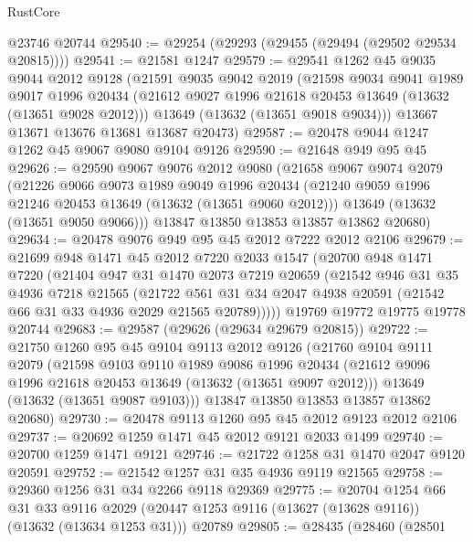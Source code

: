 \begin{lexlean}{RustCore}
\begin{coremodule}
    @23746
    @20744
@29540 := @29254 (@29293 (@29455 (@29494 (@29502 @29534 @20815))))
@29541 := @21581 @1247
@29579 := @29541
    @1262
    @45
    @9035
    @9044
    @2012
    @9128
    (@21591
      @9035
      @9042
      @2019
      (@21598
        @9034
        @9041
        @1989
        @9017
        @1996
        @20434
        (@21612 @9027 @1996 @21618 @20453 @13649 (@13632 (@13651 @9028 @2012)))
        @13649
        (@13632 (@13651 @9018 @9034)))
      @13667
      @13671
      @13676
      @13681
      @13687
      @20473)
@29587 := @20478 @9044 @1247 @1262 @45 @9067 @9080 @9104 @9126
@29590 := @21648 @949 @95 @45
@29626 := @29590
    @9067
    @9076
    @2012
    @9080
    (@21658
      @9067
      @9074
      @2079
      (@21226
        @9066
        @9073
        @1989
        @9049
        @1996
        @20434
        (@21240 @9059 @1996 @21246 @20453 @13649 (@13632 (@13651 @9060 @2012)))
        @13649
        (@13632 (@13651 @9050 @9066)))
      @13847
      @13850
      @13853
      @13857
      @13862
      @20680)
@29634 := @20478 @9076 @949 @95 @45 @2012 @7222 @2012 @2106
@29679 := @21699
    @948
    @1471
    @45
    @2012
    @7220
    @2033
    @1547
    (@20700
      @948
      @1471
      @7220
      (@21404
        @947
        @31
        @1470
        @2073
        @7219
        @20659
        (@21542
          @946
          @31
          @35
          @4936
          @7218
          @21565
          (@21722 @561 @31 @34 @2047 @4938 @20591 (@21542 @66 @31 @33 @4936 @2029 @21565 @20789)))))
    @19769
    @19772
    @19775
    @19778
    @20744
@29683 := @29587 (@29626 (@29634 @29679 @20815))
@29722 := @21750
    @1260
    @95
    @45
    @9104
    @9113
    @2012
    @9126
    (@21760
      @9104
      @9111
      @2079
      (@21598
        @9103
        @9110
        @1989
        @9086
        @1996
        @20434
        (@21612 @9096 @1996 @21618 @20453 @13649 (@13632 (@13651 @9097 @2012)))
        @13649
        (@13632 (@13651 @9087 @9103)))
      @13847
      @13850
      @13853
      @13857
      @13862
      @20680)
@29730 := @20478 @9113 @1260 @95 @45 @2012 @9123 @2012 @2106
@29737 := @20692 @1259 @1471 @45 @2012 @9121 @2033 @1499
@29740 := @20700 @1259 @1471 @9121
@29746 := @21722 @1258 @31 @1470 @2047 @9120 @20591
@29752 := @21542 @1257 @31 @35 @4936 @9119 @21565
@29758 := @29360 @1256 @31 @34 @2266 @9118 @29369
@29775 := @20704
    @1254
    @66
    @31
    @33
    @9116
    @2029
    (@20447 @1253 @9116 (@13627 (@13628 @9116)) (@13632 (@13634 @1253 @31)))
    @20789
@29805 := @28435
    (@28460
      (@28501

\end{coremodule}
\end{lexlean}
